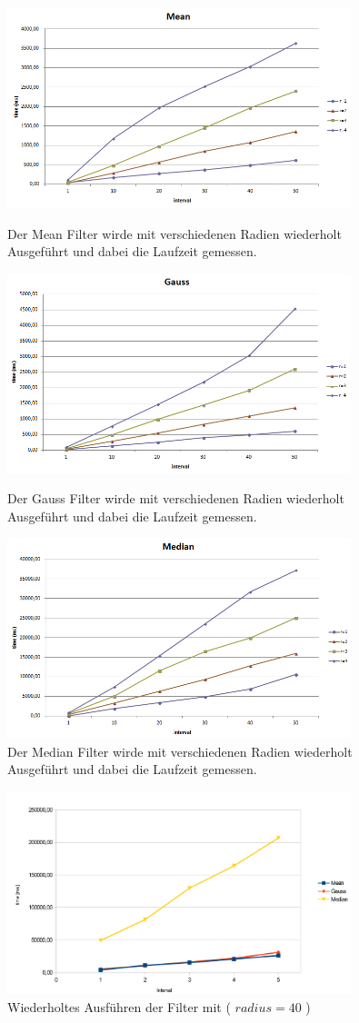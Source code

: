 \documentclass[12pt,german]{article}
\begin{document}
\begin{figure} [H]
  \centering
  \includegraphics[width=10cm]{TimeEvaluationGraph_Mean.png}
  \caption{Der Mean Filter wirde mit verschiedenen Radien wiederholt Ausgeführt und dabei die Laufzeit gemessen.}
  \includegraphics[width=10cm]{TimeEvaluationGraph_Gauss.png}
  \caption{Der Gauss Filter wirde mit verschiedenen Radien wiederholt Ausgeführt und dabei die Laufzeit gemessen.}
  \includegraphics[width=10cm]{TimeEvaluationGraph_Median.png}
  \caption{Der Median Filter wirde mit verschiedenen Radien wiederholt Ausgeführt und dabei die Laufzeit gemessen.}
\end{figure}
\begin{figure} [H]
  \centering
  \includegraphics[width=10cm]{TimeEvaluationGraph_allBig.png}
  \caption{Wiederholtes Ausführen der Filter mit  ( $ radius = 40 $ )}
\end{figure}
\end{document}
